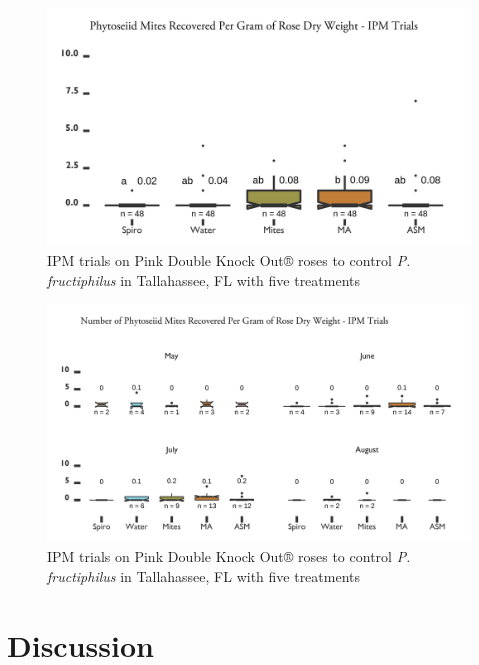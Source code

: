 \documentclass{ufdissertation}[overrideChapters] %
\begin{document}
{\begin{figure}
{\centering \includegraphics[width=1\linewidth]{figure/rrv_ipm_graph_preds_talla} 

}

\caption{IPM trials on Pink Double Knock Out® roses to control \textit{P. fructiphilus} in Tallahassee, FL with five treatments}\label{fig:ipm-talla-preds}
\end{figure}
\begin{figure}

{\centering \includegraphics[width=1\linewidth]{figure/rrv_ipm_graph_preds_talla_month} 

}

\caption{IPM trials on Pink Double Knock Out® roses to control \textit{P. fructiphilus} in Tallahassee, FL with five treatments}\label{fig:ipm-talla-preds-month}
\end{figure}
\hypertarget{discussion-2}{%
\section{Discussion}\label{discussion-2}}

}
\end{document}
